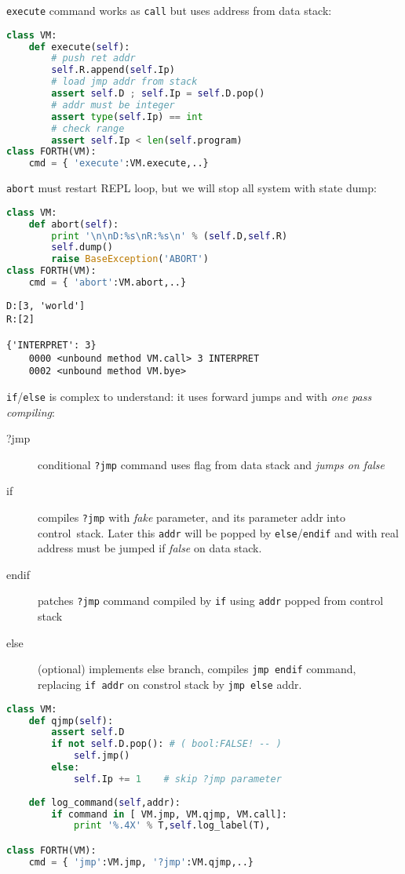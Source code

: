 \clearpage
\verb|execute| command works as \verb|call| but uses address from data stack:

\begin{lstlisting}[language=Python]
class VM:
	def execute(self):
		# push ret addr
		self.R.append(self.Ip)					
		# load jmp addr from stack
		assert self.D ; self.Ip = self.D.pop()	
		# addr must be integer
		assert type(self.Ip) == int				
		# check range
		assert self.Ip < len(self.program)		
class FORTH(VM):
	cmd = { 'execute':VM.execute,..} 
\end{lstlisting}

\clearpage
\verb|abort| must restart REPL loop, but we will stop all system with state
dump:
\begin{lstlisting}[language=Python]
class VM:
	def abort(self):
		print '\n\nD:%s\nR:%s\n' % (self.D,self.R)
		self.dump()
		raise BaseException('ABORT')
class FORTH(VM):
	cmd = { 'abort':VM.abort,..} 
\end{lstlisting}
\begin{lstlisting}
D:[3, 'world']
R:[2]

{'INTERPRET': 3}
	0000 <unbound method VM.call> 3 INTERPRET 
	0002 <unbound method VM.bye> 
\end{lstlisting}
		
\clearpage
\noindent
\verb|if|/\verb|else| is complex to understand: it uses forward jumps and
 with \emph{one pass compiling}:
\begin{description}
\item[?jmp] conditional \verb|?jmp| command uses flag from data stack and
\emph{jumps on false}
\item[if] compiles \verb|?jmp| with \emph{fake} parameter, and  its
parameter addr into control\ stack. Later this \verb|addr| will be popped by
\verb|else|/\verb|endif| and  with real address must be
jumped if \emph{false} on data stack.
\item[endif] patches \verb|?jmp| command compiled by \verb|if| using
\verb|addr| popped from control stack
\item[else] (optional) implements else branch, compiles \verb|jmp endif|
command, replacing \verb|if addr| on constrol stack by \verb|jmp else| addr.
\end{description}

\begin{lstlisting}[language=Python]
class VM:
	def qjmp(self):
		assert self.D
		if not self.D.pop(): # ( bool:FALSE! -- ) 
			self.jmp()
		else:
			self.Ip += 1	# skip ?jmp parameter
			
	def log_command(self,addr):
		if command in [ VM.jmp, VM.qjmp, VM.call]:
			print '%.4X' % T,self.log_label(T),

class FORTH(VM):
	cmd = { 'jmp':VM.jmp, '?jmp':VM.qjmp,..}
\end{lstlisting}

